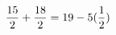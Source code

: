 \documentclass[preview]{standalone}
\begin{document}
\begin{align*}
\special{dvisvgm:raw <g id='unique000'>}\frac{15}{2} + \frac{18}{2} = 19 - 5 (\frac{1}{2})\special{dvisvgm:raw </g>}
\end{align*}
\end{document}

